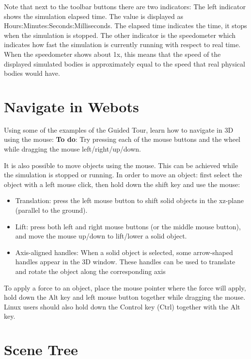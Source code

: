 \documentclass{cmc}
\begin{document}
Note that next to the toolbar buttons there are two indicators: The
left indicator shows the simulation elapsed time. The value is
displayed as Hours:Minutes:Seconds:Milliseconds. The elapsed time
indicates the time, it stops when the simulation is stopped. The other
indicator is the speedometer which indicates how fast the simulation
is currently running with respect to real time. When the speedometer
shows about 1x, this means that the speed of the displayed simulated
bodies is approximately equal to the speed that real physical bodies
would have.

\section{Navigate in Webots}
\label{sec:navigate-webots}

Using some of the examples of the Guided Tour, learn how to navigate
in 3D using the mouse: \textbf{To do}: Try pressing each of the mouse
buttons and the wheel while dragging the mouse left/right/up/down.

It is also possible to move objects using the mouse. This can be
achieved while the simulation is stopped or running. In order to move
an object: first select the object with a left mouse click, then hold
down the shift key and use the mouse:
\begin{itemize}
\item Translation: press the left mouse button to shift solid objects
  in the xz-plane (parallel to the ground).
\item Lift: press both left and right mouse buttons (or the middle
  mouse button), and move the mouse up/down to lift/lower a solid
  object.
\item Axis-aligned handles: When a solid object is selected, some
  arrow-shaped handles appear in the 3D window. These handles can be
  used to translate and rotate the object along the corresponding axis
\end{itemize}

To apply a force to an object, place the mouse pointer where the force
will apply, hold down the Alt key and left mouse button together while
dragging the mouse. Linux users should also hold down the Control key
(Ctrl) together with the Alt key.

\section{Scene Tree}
\label{sec:scene-tree}
\end{document}
